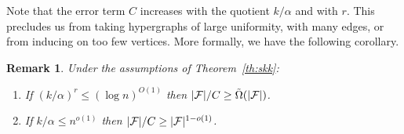 \documentclass[11pt]{article}
\newtheorem{theo}{Theorem}[section]
\newtheorem{coro}[theo]{Corollary}
\newtheorem{remark}[theo]{Remark}
\newcommand{\FF}{{\cal F}}
\renewcommand{\wp}{\mathrm{span}}
\renewcommand{\a}{\alpha}
\begin{document}

Note that the error term $C$ increases with the quotient $k/\a$ and with $r$.
This precludes us from taking hypergraphs of large uniformity, with many edges, or from inducing on too few vertices.
More formally, we have the following corollary.

\begin{remark}
	Under the assumptions of Theorem~\ref{th:skk}: %
	\begin{enumerate}
		\item If $(k/\a)^r \le (\log n)^{O(1)}$ then $|\FF|/C \ge \tilde{\Omega}(|\FF|)$.
		\item If $k/\a \le n^{o(1)}$ then $|\FF|/C \ge |\FF|^{1-o(1)}$.
	\end{enumerate}
\end{remark}


\end{document}
